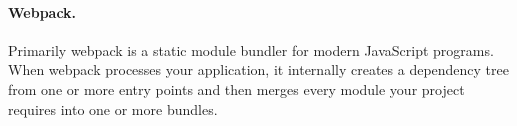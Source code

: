 \paragraph*{Webpack.} Primarily webpack is a static module bundler for modern JavaScript programs. When webpack processes your application, it internally creates a dependency tree from one or more entry points and then merges every module your project requires into one or more bundles.\cite{webpack-doc}

